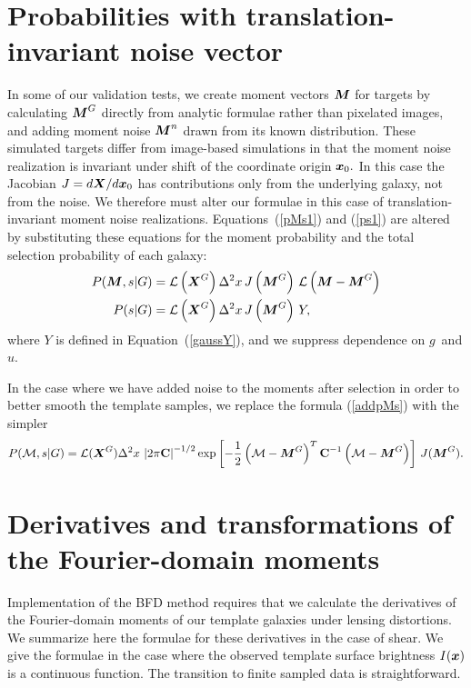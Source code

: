 \documentclass[11pt,preprint,flushrt]{aastex}
\def\eqq#1{Equation~(\ref{#1})}
\newcommand{\vecX}{\mbox{\boldmath $X$}}
\newcommand{\vecg}{\mbox{\boldmath $g$}}
\newcommand{\vecM}{\mbox{\boldmath $M$}}
\newcommand{\vecx}{\mbox{\boldmath $x$}}
\newcommand{\vecu}{\mbox{\boldmath $u$}}
\newcommand{\matC}{\mbox{$\bf C$}}
\newcommand{\likeli}{\mbox{$\mathcal{L}$}}
\newcommand\edit[1]{#1}
\begin{document}
\section{Probabilities with translation-invariant noise vector}
\label{translationnoise}
In some of our validation tests, we create moment vectors $\vecM$ for
targets by calculating $\vecM^G$
directly from analytic formulae rather than pixelated images, and adding
moment noise $\vecM^n$ drawn from its known distribution.  These simulated
targets differ from image-based simulations in that the moment noise
realization is invariant under shift of the coordinate origin $\vecx_0.$ In this
case the Jacobian $J=d\vecX/d\vecx_0$ has contributions only from the
underlying galaxy, not from the noise.  We therefore must alter our
formulae in this case of translation-invariant moment noise
realizations.  Equations~(\ref{pMs1}) and (\ref{ps1}) are altered by
substituting these equations for the moment probability and the total
selection probability of each galaxy:
\begin{align}
P(\vecM, s | G) & = \likeli\left(\vecX^G\right) \Delta^2x\,
                  J\left(\vecM^G\right)\,\likeli\left(\vecM-\vecM^G\right) \\
P(s | G) & = \likeli\left(\vecX^G\right)  \Delta^2x \, J\left(\vecM^G\right)\,  Y, 
\end{align}
where $Y$ is defined in \eqq{gaussY}, \edit{and we suppress dependence on
\vecg\ and \vecu.}

In the case where we have added noise to the moments after selection
in order to better smooth the template samples, we replace the formula
(\ref{addpMs}) with the simpler
\begin{equation}
P({\mathcal M},s | G) = \likeli(\vecX^G) \Delta^2x\, \left|2\pi
  \matC\right|^{-1/2}
\exp\left[-\frac{1}{2}\left({\mathcal M}-\vecM^G\right)^T \matC^{-1} 
\left({\mathcal M}-\vecM^G\right)\right] \, J(\vecM^G).
\end{equation}

\section{Derivatives and transformations of the Fourier-domain moments}
\label{momentcalcs}
Implementation of the BFD method requires that we calculate the
derivatives of the Fourier-domain moments of our template galaxies
under lensing distortions.  We summarize here the formulae for these
derivatives in the case of shear.  We give the formulae in the case
where the observed template surface brightness $I(\vecx)$ is a
continuous function.  The transition to finite sampled data is
straightforward. 
\end{document}
